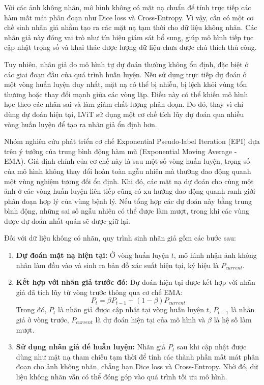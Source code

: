 Với các ảnh không nhãn, mô hình không có mặt nạ chuẩn để tính trực tiếp các hàm mất mát phân đoạn như Dice loss và Cross-Entropy. Vì vậy, cần có một cơ chế sinh nhãn giả nhằm tạo ra các mặt nạ tạm thời cho dữ liệu không nhãn. Các nhãn giả này đóng vai trò như tín hiệu giám sát bổ sung, giúp mô hình tiếp tục cập nhật trọng số và khai thác được lượng dữ liệu chưa được chú thích thủ công.

Tuy nhiên, nhãn giả do mô hình tự dự đoán thường không ổn định, đặc biệt ở các giai đoạn đầu của quá trình huấn luyện. Nếu sử dụng trực tiếp dự đoán ở một vòng huấn luyện duy nhất, mặt nạ có thể bị nhiễu, bị lệch khỏi vùng tổn thương hoặc thay đổi mạnh giữa các vòng lặp. Điều này có thể khiến mô hình học theo các nhãn sai và làm giảm chất lượng phân đoạn. Do đó, thay vì chỉ dùng dự đoán hiện tại, LViT sử dụng một cơ chế tích lũy dự đoán qua nhiều vòng huấn luyện để tạo ra nhãn giả ổn định hơn.

Nhóm nghiên cứu phát triển cơ chế Exponential Pseudo-label Iteration (EPI) dựa trên ý tưởng của trung bình động hàm mũ (Exponential Moving Average - EMA). Giả định chính của cơ chế này là sau một số vòng huấn luyện, trọng số của mô hình không thay đổi hoàn toàn ngẫu nhiên mà thường dao động quanh một vùng nghiệm tương đối ổn định. Khi đó, các mặt nạ dự đoán cho cùng một ảnh ở các vòng huấn luyện liên tiếp cũng có xu hướng dao động quanh ranh giới phân đoạn hợp lý của vùng bệnh lý. Nếu tổng hợp các dự đoán này bằng trung bình động, những sai số ngẫu nhiên có thể được làm mượt, trong khi các vùng được dự đoán nhất quán sẽ được giữ lại.

Đối với dữ liệu không có nhãn, quy trình sinh nhãn giả gồm các bước sau:

\begin{enumerate}
    \item \textbf{Dự đoán mặt nạ hiện tại:} Ở vòng huấn luyện $t$, mô hình nhận ảnh không nhãn làm đầu vào và sinh ra bản đồ xác suất hiện tại, ký hiệu là $P_{current}$.

    \item \textbf{Kết hợp với nhãn giả trước đó:} Dự đoán hiện tại được kết hợp với nhãn giả đã tích lũy từ vòng trước thông qua cơ chế EMA:
    \[
        P_t = \beta P_{t-1} + (1 - \beta) P_{current}
    \]
    Trong đó, $P_t$ là nhãn giả được cập nhật tại vòng huấn luyện $t$, $P_{t-1}$ là nhãn giả ở vòng trước, $P_{current}$ là dự đoán hiện tại của mô hình và $\beta$ là hệ số làm mượt.

    \item \textbf{Sử dụng nhãn giả để huấn luyện:} Nhãn giả $P_t$ sau khi cập nhật được dùng như mặt nạ tham chiếu tạm thời để tính các thành phần mất mát phân đoạn cho ảnh không nhãn, chẳng hạn Dice loss và Cross-Entropy. Nhờ đó, dữ liệu không nhãn vẫn có thể đóng góp vào quá trình tối ưu mô hình.
\end{enumerate}

